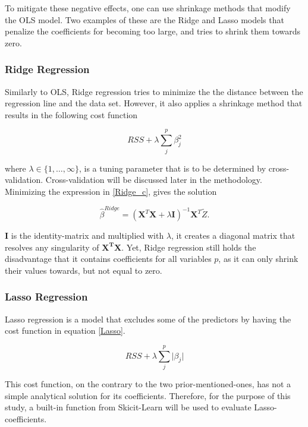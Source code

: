 \documentclass[...,numrefs]{wiley-article}
\begin{document}
\noindent To mitigate these negative effects, one can use shrinkage methods that modify the OLS model. Two examples of these are the Ridge and Lasso models that penalize the coefficients for becoming too large, and tries to shrink them towards zero. 


\subsubsection{Ridge Regression}
Similarly to OLS, Ridge regression tries to minimize the the distance between the regression line and the data set. However, it also applies a shrinkage method that results in the following cost function

\begin{equation}
    RSS + \lambda\sum_{j}^{p}\beta_j^2
    \label{Ridge_c}
\end{equation}

where $\lambda \in \{1,\dots,\infty\}$, is a tuning parameter that is to be determined by cross-validation. Cross-validation will be discussed later in the methodology. Minimizing the expression in \ref{Ridge_c}, gives the solution

\begin{equation}
    \hat{\beta}^{Ridge} = (\boldsymbol{X}^T\boldsymbol{X}+\lambda\boldsymbol{I})^{-1}\boldsymbol{X}^T\tilde{Z}.
\end{equation}

$\boldsymbol{I}$ is the identity-matrix and multiplied with $\lambda$, it creates a diagonal matrix that resolves any singularity of $\boldsymbol{X^T}\boldsymbol{X}$. Yet, Ridge regression still holds the disadvantage that it contains coefficients for all variables $p$, as it can only shrink their values towards, but not equal to zero. 


\subsubsection{Lasso Regression}
Lasso regression is a model that excludes some of the predictors by having the cost function in equation \ref{Lasso}.

\begin{equation}
    RSS + \lambda\sum_{j}^{p}\lvert\beta_j\rvert
    \label{Lasso}
\end{equation}


This cost function, on the contrary to the two prior-mentioned-ones, has not a simple analytical solution for its coefficients. Therefore, for the purpose of this study, a built-in function from Skicit-Learn will be used to evaluate Lasso-coefficients.  
\end{document}
